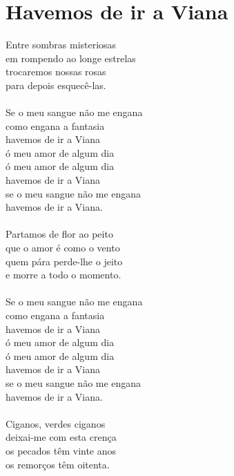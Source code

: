 \documentclass{article}
\begin{document}
\section{ Havemos de ir a Viana}
Entre sombras misteriosas\\
em rompendo ao longe estrelas\\
trocaremos nossas rosas\\
para depois esquecê-las.\\
\\
Se o meu sangue não me engana \\
como engana a fantasia \\
havemos de ir a Viana\\
ó meu amor de algum dia\\
ó meu amor de algum dia\\
havemos de ir a Viana\\
se o meu sangue não me engana \\
havemos de ir a Viana.\\
\\
Partamos de flor ao peito\\
que o amor é como o vento\\
quem pára perde-lhe o jeito\\
e morre a todo o momento.\\
\\
Se o meu sangue não me engana \\
como engana a fantasia\\
havemos de ir a Viana\\
ó meu amor de algum dia\\
ó meu amor de algum dia\\
havemos de ir a Viana\\
se o meu sangue não me engana\\
havemos de ir a Viana.\\
\\
Ciganos, verdes ciganos\\
deixai-me com esta crença\\
os pecados têm vinte anos \\
os remorços têm oitenta.\\
\end{document}
